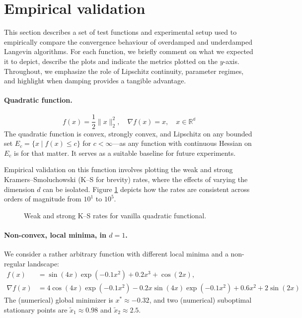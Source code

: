 \documentclass[12pt]{article}
\begin{document}
\section{Empirical validation}

This section describes a set of test functions and experimental setup used to empirically compare the convergence behaviour of overdamped and underdamped Langevin algorithms. For each function, we briefly comment on what we expected it to depict, describe the plots and indicate the metrics plotted on the $y$-axis.
Throughout, we emphasize the role of Lipschitz continuity, parameter regimes, and highlight when damping provides a tangible advantage.

\paragraph{Quadratic function.}
\[
    f(x) = \frac{1}{2}\|x\|_2^2,\quad \nabla f(x) = x, \quad x \in \mathbb{R^d}
\]
The quadratic function is convex, strongly convex, and Lipschitz on any bounded set $E_c = \{x \mid f(x) \le c\}$ for $c < \infty$---as any function with continuous Hessian on $E_c$ is for that matter.
It serves as a suitable baseline for future experiments.

Empirical validation on this function involves plotting the weak and strong Kramers--Smoluchowski (K--S for brevity) rates, where the effects of varying the dimension $d$ can be isolated.
Figure \ref{fig:x2d1050} depicts how the rates are consistent across orders of magnitude from $10^1$ to $10^5$.
\begin{figure}[!htbp]
    \centering
    \begin{minipage}{0.48\textwidth}
        \centering
    \end{minipage}\hfill
    \begin{minipage}{0.48\textwidth}
        \centering
    \end{minipage}
    \caption{Weak and strong K--S rates for vanilla quadratic functional.}
    \label{fig:x2d1050}
\end{figure}

\paragraph{Non-convex, local minima, in $d=1$.}
We consider a rather arbitrary function with different local minima and a non-regular landscape:
\begin{align}
    \label{eq: 1d green purple}
    f(x) &= \sin(4x)\exp(-0.1 x^2) + 0.2 x^3 + \cos(2x), \\
    \nabla f(x) &= 4\cos(4x)\exp(-0.1 x^2) - 0.2 x \sin(4x)\exp(-0.1 x^2) + 0.6 x^2 + 2 \sin(2x)\nonumber
\end{align}
The (numerical) global minimizer is $x^* \approx -0.32$,
and two (numerical) suboptimal stationary points are $\tilde{x}_1 \approx 0.98$ and $\tilde{x}_2 \approx 2.5$.
\end{document}
